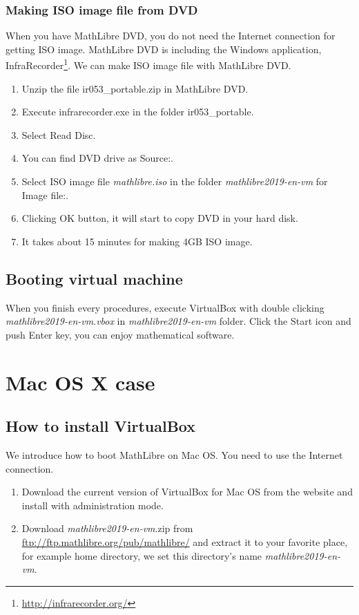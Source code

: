 \documentclass[a4]{article}
\newcommand{\ir}{ir053\_portable}
\newcommand{\vm}{{\em mathlibre2019-en-vm}}
\begin{document}
\subsubsection{Making ISO image file from DVD}
When you have MathLibre DVD, 
you do not need the Internet connection for getting ISO image.
MathLibre DVD is including the Windows application, InfraRecorder\footnote{\url{http://infrarecorder.org/}}.
We can make ISO image file with MathLibre DVD.
\begin{enumerate}
 \item Unzip the file \ir.zip{} in MathLibre DVD.
 \item Execute infrarecorder.exe in the folder \ir.
 \item Select Read Disc.
 \item You can find DVD drive as Source:.
 \item Select ISO image file {\em mathlibre.iso} in the folder \vm{} for Image file:.
 \item Clicking OK button, it will start to copy DVD in your hard disk.
 \item It takes about 15 minutes for making 4GB ISO image.
\end{enumerate}

\subsection{Booting virtual machine}
When you finish every procedures,
execute VirtualBox with double clicking \vm.{\em vbox} in \vm{} folder.
Click the Start icon and push Enter key, you can enjoy mathematical software.

\section{Mac OS X case}
\subsection{How to install VirtualBox}
We introduce how to boot MathLibre on Mac OS.
You need to use the Internet connection.
\begin{enumerate}
 \item Download the current version of VirtualBox for Mac OS from the
       website and install with administration mode.
 \item Download \vm.zip{} from
       \url{ftp://ftp.mathlibre.org/pub/mathlibre/} and extract it to
       your favorite place, for example home directory, we set this
       directory's name \vm.
\end{enumerate}
\end{document}
